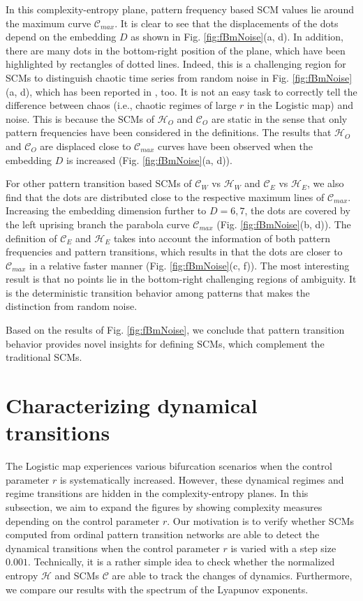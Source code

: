 \documentclass[12pt,aip,cha,reprint,nofootinbib]{revtex4-1}
\begin{document}
In this complexity-entropy plane, pattern frequency based SCM values lie around the maximum curve $\mathcal{C}_{max}$. It is clear to see that the displacements of the dots depend on the embedding $D$ as shown in Fig. \ref{fig:fBmNoise}(a, d). In addition, there are many dots in the bottom-right position of the plane, which have been highlighted by rectangles of dotted lines. Indeed, this is a challenging region for SCMs to distinguish chaotic time series from random noise in Fig. \ref{fig:fBmNoise}(a, d), which has been reported in \cite{BorgesAMC2019}, too. It is not an easy task to correctly tell the difference between chaos (i.e., chaotic regimes of large $r$ in the Logistic map) and noise. This is because the SCMs of $\mathcal{H}_O$ and $\mathcal{C}_O$ are static in the sense that only pattern frequencies have been considered in the definitions. The results that  $\mathcal{H}_O$ and $\mathcal{C}_O$ are displaced close to $\mathcal{C}_{max}$ curves have been observed when the embedding $D$ is increased (Fig. \ref{fig:fBmNoise}(a, d)). 

For other pattern transition based SCMs of $\mathcal{C}_W$ vs $\mathcal{H}_W$ and $\mathcal{C}_E$ vs $\mathcal{H}_E$, we also find that the dots are distributed close to the respective maximum lines of $\mathcal{C}_{max}$. Increasing the embedding dimension further to $D=6, 7$, the dots are covered by the left uprising branch the parabola curve $\mathcal{C}_{max}$ (Fig. \ref{fig:fBmNoise}(b, d)). The definition of $\mathcal{C}_{E}$ and $\mathcal{H}_{E}$ takes into account the information of both pattern frequencies and pattern transitions, which results in that the dots are closer to $\mathcal{C}_{max}$ in a relative faster manner (Fig. \ref{fig:fBmNoise}(c, f)). The most interesting result is that no points lie in the bottom-right challenging regions of ambiguity. It is the deterministic transition behavior among patterns that makes the distinction from random noise. 

Based on the results of Fig. \ref{fig:fBmNoise}, we conclude that pattern transition behavior provides novel insights for defining SCMs, which complement the traditional SCMs. 

\section{Characterizing dynamical transitions} \label{sec:transi}
The Logistic map experiences various bifurcation scenarios when the control parameter $r$ is systematically increased. However, these dynamical regimes and regime transitions are hidden in the complexity-entropy planes. In this subsection, we aim to expand the figures by showing complexity measures depending on the control parameter $r$. Our motivation is to verify whether SCMs computed from ordinal pattern transition networks are able to detect the dynamical transitions when the control parameter $r$ is varied with a step size $0.001$. Technically, it is a rather simple idea to check whether the normalized entropy $\mathcal{H}$ and SCMs $\mathcal{C}$ are able to track the changes of dynamics. Furthermore, we compare our results with the spectrum of the Lyapunov exponents. 
\end{document}
